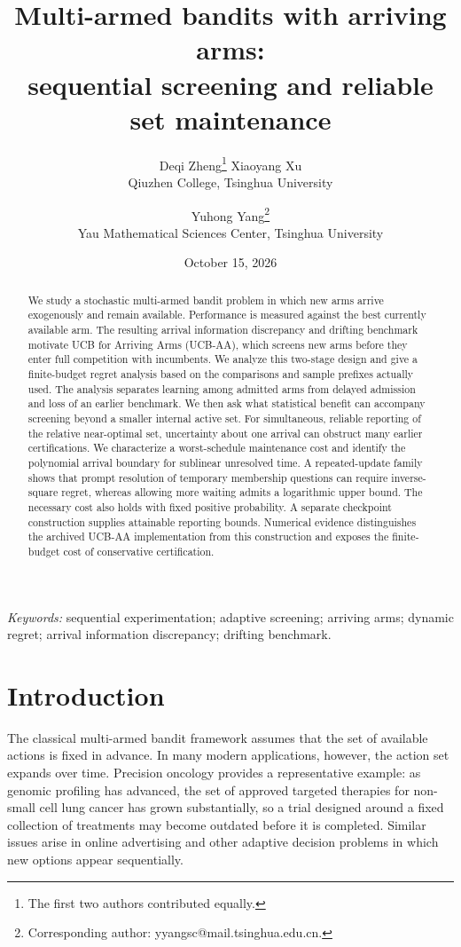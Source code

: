 \documentclass[11pt]{article}
\title{Multi-armed bandits with arriving arms:\\
sequential screening and reliable set maintenance}
\author{}
\author{Deqi Zheng\thanks{The first two authors contributed equally.} \quad
 Xiaoyang Xu\footnotemark[1] \\ Qiuzhen College, Tsinghua University
 \and Yuhong Yang\thanks{Corresponding author: yyangsc@mail.tsinghua.edu.cn.}\\
 Yau Mathematical Sciences Center, Tsinghua University}
\date{October 15, 2026}
\begin{document}
\maketitle

\begin{abstract}
We study a stochastic multi-armed bandit problem in which new arms arrive
exogenously and remain available. Performance is measured against the best
currently available arm. The resulting arrival information discrepancy and
drifting benchmark motivate UCB for Arriving Arms (UCB-AA), which screens new
arms before they enter full competition with incumbents. We analyze this
two-stage design and give a finite-budget regret analysis based on the
comparisons and sample prefixes actually used. The analysis separates learning
among admitted arms from delayed admission and loss of an earlier benchmark.
We then ask what statistical benefit can accompany screening beyond a smaller
internal active set. For simultaneous, reliable reporting of the relative
near-optimal set, uncertainty about one arrival can obstruct many earlier
certifications. We characterize a worst-schedule maintenance cost and identify
the polynomial arrival boundary for sublinear unresolved time. A repeated-update
family shows that prompt resolution of temporary membership questions can
require inverse-square regret, whereas allowing more waiting admits a
logarithmic upper bound. The necessary cost also holds with fixed positive
probability. A separate checkpoint construction supplies attainable reporting
bounds. Numerical evidence distinguishes the archived UCB-AA implementation
from this construction and exposes the finite-budget cost of conservative
certification.
\end{abstract}
\noindent\textit{Keywords:} sequential experimentation; adaptive screening;
arriving arms; dynamic regret; arrival information discrepancy; drifting benchmark.

\section{Introduction}
\label{sec:introduction}

The classical multi-armed bandit framework assumes that the set of available actions is fixed in advance. In many modern applications, however, the action set expands over time. Precision oncology provides a representative example: as genomic profiling has advanced, the set of approved targeted therapies for non-small cell lung cancer has grown substantially, so a trial designed around a fixed collection of treatments may become outdated before it is completed. Similar issues arise in online advertising and other adaptive decision problems in which new options appear sequentially.
\end{document}
